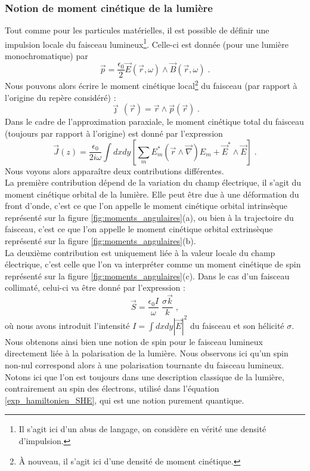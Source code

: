 \documentclass[a4paper,11pt]{article} %
\begin{document}
	\subsubsection{Notion de moment cinétique de la lumière}
	Tout comme pour les particules matérielles, il est possible de définir une impulsion locale du faisceau lumineux\footnote{Il s'agit ici d'un abus de langage, on considère en vérité une densité d'impulsion.}. Celle-ci est donnée (pour une lumière monochromatique) par 
	\begin{equation*}
		\vec{p} = \frac{\epsilon_0}{2} \vec{E}(\vec{r}, \omega) \wedge \vec{B}(\vec{r}, \omega) \; .
	\end{equation*}
	Nous pouvons alors écrire le moment cinétique local\footnote{\`A nouveau, il s'agit ici d'une densité de moment cinétique.} du faisceau (par rapport à l'origine du repère considéré) :
	\begin{equation*}
		\vec{\jmath} \, (\vec{r}) = \vec{r} \wedge \vec{p}(\vec{r}) \; .
	\end{equation*}	
	Dans le cadre de l'approximation paraxiale, le moment cinétique total du faisceau (toujours par rapport à l'origine) est donné par l'expression
	\begin{equation}
		\label{def_J(z)}
		\vec{J}(z) = \frac{\epsilon_0}{2 i \omega} \int dx dy \left[ \sum_m E_m^* (\vec{r} \wedge \vec{\nabla}) E_m + \vec{E}^* \wedge \vec{E} \right] \; .
	\end{equation}
	Nous voyons alors apparaître deux contributions différentes.\\
	
	La première contribution dépend de la variation du champ électrique, il s'agit du moment cinétique orbital de la lumière. Elle peut être due à une déformation du front d'onde, c'est ce que l'on appelle le moment cinétique orbital intrinsèque représenté sur la figure \ref{fig:moments_angulaires}(a), ou bien à la trajectoire du faisceau, c'est ce que l'on appelle le moment cinétique orbital extrinsèque représenté sur la figure \ref{fig:moments_angulaires}(b).\\	
	
	La deuxième contribution est uniquement liée à la valeur locale du champ électrique, c'est celle que l'on va interpréter comme un moment cinétique de spin représenté sur la figure \ref{fig:moments_angulaires}(c). Dans le cas d'un faisceau collimaté, celui-ci va être donné par l'expression :
		\begin{equation*}
			\vec{S} = \frac{\epsilon_0 I}{\omega} \; \frac{\sigma \vec{k}}{k} \; ,
		\end{equation*}
	où nous avons introduit l'intensité $ I = \int \! dx dy |\vec{E}|^2 $ du faisceau et son hélicité $ \sigma $. Nous obtenons ainsi bien une notion de spin pour le faisceau lumineux directement liée à la polarisation de la lumière. Nous observons ici qu'un spin non-nul correspond alors à une polarisation tournante du faisceau lumineux. Notons ici que l'on est toujours dans une description classique de la lumière, contrairement au spin des électrons, utilisé dans l'équation \eqref{exp_hamiltonien_SHE}, qui est une notion purement quantique.	
	
\end{document}
